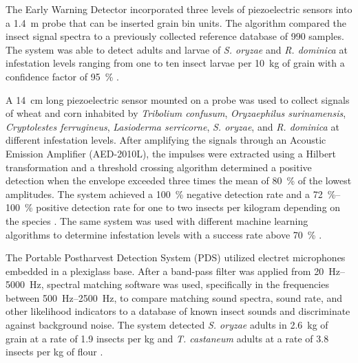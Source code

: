 \documentclass[../Vibro-Acoustic Signatures and Detection Algorithms for Stored Product Insects.tex]{subfiles}
\begin{document}
The Early Warning Detector incorporated three levels of piezoelectric sensors into a \SI{1.4}{\meter} probe that can be inserted grain bin units. The algorithm compared the insect signal spectra to a previously collected reference database of 990 samples. The system was able to detect adults and larvae of \textit{S. oryzae} and \textit{R. dominica} at infestation levels ranging from one to ten insect larvae per \SI{10}{\kilo\gram} of grain with a confidence factor of \SI{95}{\percent} \cite{fleurat-lessardAcousticDetectionAutomatic2006}.

A \SI{14}{\centi\meter} long piezoelectric sensor mounted on a probe was used to collect signals of wheat and corn inhabited by \textit{Tribolium confusum}, \textit{Oryzaephilus surinamensis}, \textit{Cryptolestes ferrugineus}, \textit{Lasioderma serricorne}, \textit{S. oryzae}, and \textit{R. dominica} at different infestation levels. After amplifying the signals through an Acoustic Emission Amplifier (AED-2010L), the impulses were extracted using a Hilbert transformation and a threshold crossing algorithm determined a positive detection when the envelope exceeded three times the mean of \SI{80}{\percent} of the lowest amplitudes. The system achieved a \SI{100}{\percent} negative detection rate and a \SIrange{72}{100}{\percent} positive detection rate for one to two insects per kilogram depending on the species \cite{eliopoulosDetectionAdultBeetles2015}. The same system was used with different machine learning algorithms to determine infestation levels with a success rate above \SI{70}{\percent} \cite{eliopoulosEstimationPopulationDensity2016}.

The Portable Postharvest Detection System (PDS) utilized electret microphones embedded in a plexiglass base. After a band-pass filter was applied from \SIrange{20}{5000}{\hertz}, spectral matching software was used, specifically in the frequencies between \SIrange{500}{2500}{\hertz}, to compare matching sound spectra, sound rate, and other likelihood indicators to a database of known insect sounds and discriminate against background noise. The system detected \textit{S. oryzae} adults in \SI{2.6}{\kilo\gram} of grain at a rate of 1.9 insects per \si{\kilo\gram} and \textit{T. castaneum} adults at a rate of 3.8 insects per \si{\kilo\gram} of flour \cite{mankinPerformanceLowCostAcoustic2020}.
\end{document}

